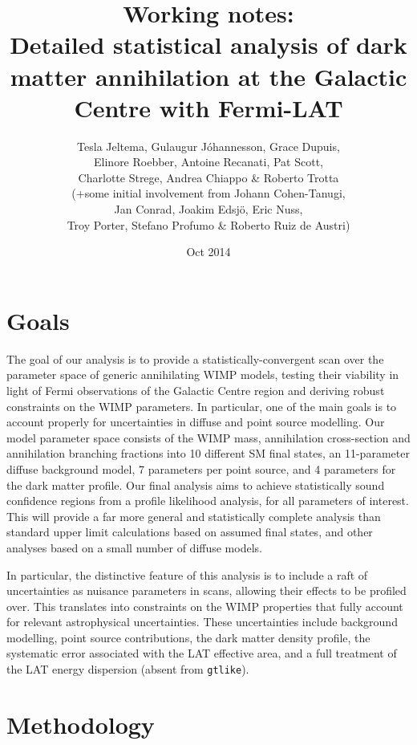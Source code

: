 \documentclass{article}
\author{Tesla Jeltema, Gu{\dh}laugur J\'ohannesson, Grace Dupuis, \\Elinore Roebber, Antoine Recanati, Pat Scott, \\Charlotte Strege, Andrea Chiappo \& Roberto Trotta\\ (+some initial involvement from Johann Cohen-Tanugi, \\Jan Conrad, Joakim Edsj\"o, Eric Nuss, \\Troy Porter, Stefano Profumo \& Roberto Ruiz de Austri)}
\date{Oct 2014}
\title{\textbf{Working notes:}\\Detailed statistical analysis of dark matter annihilation at the Galactic Centre with Fermi-LAT}
\begin{document}
\VerbatimFootnotes
\maketitle

\section{Goals}

The goal of our analysis is to provide a statistically-convergent scan over the parameter space of generic annihilating WIMP models, testing their viability in light of Fermi observations of the Galactic Centre region and deriving robust constraints on the WIMP parameters.  In particular, one of the main goals is to account properly for uncertainties in diffuse and point source modelling.  Our model parameter space consists of the WIMP mass, annihilation cross-section and annihilation branching fractions into 10 different SM final states, an 11-parameter diffuse background model, 7 parameters per point source, and 4 parameters for the dark matter profile.  Our final analysis aims to achieve statistically sound confidence regions from a profile likelihood analysis, for all parameters of interest.  This will provide a far more general and statistically complete analysis than standard upper limit calculations based on assumed final states, and other analyses based on a small number of diffuse models.

In particular, the distinctive feature of this analysis is to include a raft of uncertainties as nuisance parameters in scans, allowing their effects to be profiled over. This translates into constraints on the WIMP properties that fully account for relevant astrophysical uncertainties.  These uncertainties include background modelling, point source contributions, the dark matter density profile, the systematic error associated with the LAT effective area, and a full treatment of the LAT energy dispersion (absent from \texttt{gtlike}).

\section{Methodology}
\end{document}

